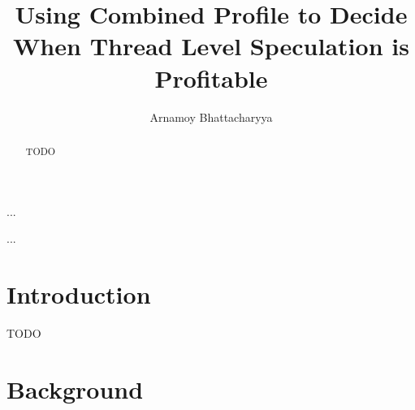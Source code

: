 \documentclass[10pt]{report}          %
\title{Using Combined Profile to Decide When Thread Level Speculation is Profitable}
\author{Arnamoy Bhattacharyya}
\begin{document}
\admin %


\begin{abstract}
TODO
\end{abstract}


\doublespacing
\begin{acknowledgements} %
%
\end{acknowledgements}

\singlespacing
\tableofcontents
\listoftables  %
\listoffigures %
\begin{listofplates}
...            %
\end{listofplates}
\begin{listofsymbols}
...            %
\end{listofsymbols}
\doublespacing %
\bodyoftext

\chapter{Introduction}

TODO

\chapter{Background}
\end{document}
